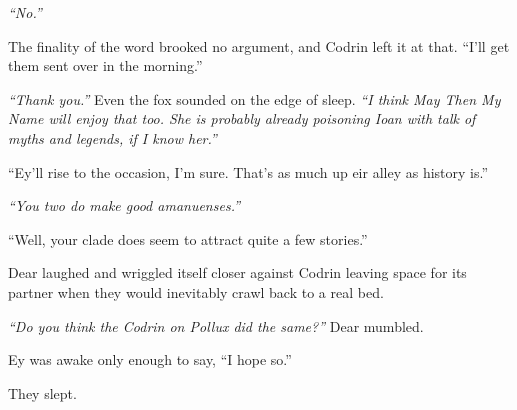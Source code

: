 \emph{``No.''}

The finality of the word brooked no argument, and Codrin left it at that. ``I'll get them sent over in the morning.''

\emph{``Thank you.''} Even the fox sounded on the edge of sleep. \emph{``I think May Then My Name will enjoy that too. She is probably already poisoning Ioan with talk of myths and legends, if I know her.''}

``Ey'll rise to the occasion, I'm sure. That's as much up eir alley as history is.''

\emph{``You two do make good amanuenses.''}

``Well, your clade does seem to attract quite a few stories.''

Dear laughed and wriggled itself closer against Codrin leaving space for its partner when they would inevitably crawl back to a real bed.

\emph{``Do you think the Codrin on Pollux did the same?''} Dear mumbled.

Ey was awake only enough to say, ``I hope so.''

They slept.
